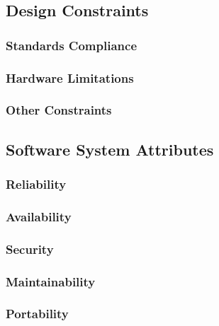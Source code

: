 \documentclass[a4paper]{article}
\begin{document}
    \subsection{Design Constraints}
    
        \subsubsection{Standards Compliance}
        
        \subsubsection{Hardware Limitations}
        
        \subsubsection{Other Constraints}
    
    \subsection{Software System Attributes}
        
        \subsubsection{Reliability}
        
        \subsubsection{Availability}
        
        \subsubsection{Security}
        
        \subsubsection{Maintainability}
        
        \subsubsection{Portability}
        
\newpage
\end{document}
